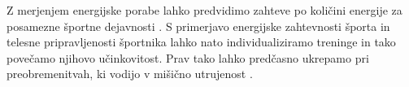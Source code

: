 Z merjenjem energijske porabe lahko predvidimo zahteve po količini energije za posamezne športne dejavnosti \cite{botton2011energy,osgnach2010energy}. S primerjavo energijske zahtevnosti športa in telesne pripravljenosti športnika lahko nato individualiziramo treninge in tako povečamo njihovo učinkovitost. Prav tako lahko predčasno ukrepamo pri preobremenitvah, ki vodijo v mišično utrujenost \cite{sahlin1998energy,reilly1997energetics}.

\renewcommand{\folder}{./pogl/01-uvod}




